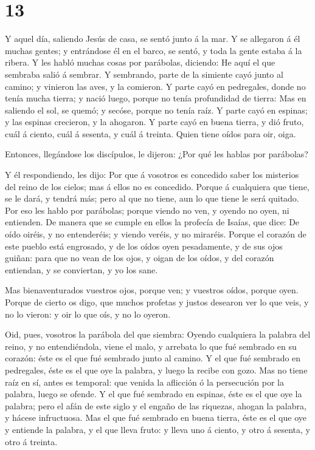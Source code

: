 \hypertarget{section-12}{%
\section{13}\label{section-12}}

 Y aquel día, saliendo Jesús de casa, se sentó junto á la
mar.  Y se allegaron á él muchas gentes; y entrándose él en
el barco, se sentó, y toda la gente estaba á la ribera.  Y
les habló muchas cosas por parábolas, diciendo: He aquí el que sembraba
salió á sembrar.  Y sembrando, parte de la simiente cayó
junto al camino; y vinieron las aves, y la comieron.  Y
parte cayó en pedregales, donde no tenía mucha tierra; y nació luego,
porque no tenía profundidad de tierra:  Mas en saliendo el
sol, se quemó; y secóse, porque no tenía raíz.  Y parte cayó
en espinas; y las espinas crecieron, y la ahogaron.  Y parte
cayó en buena tierra, y dió fruto, cuál á ciento, cuál á sesenta, y cuál
á treinta.  Quien tiene oídos para oir, oiga.

 Entonces, llegándose los discípulos, le dijeron: ¿Por qué
les hablas por parábolas?

 Y él respondiendo, les dijo: Por que á vosotros es
concedido saber los misterios del reino de los cielos; mas á ellos no es
concedido.  Porque á cualquiera que tiene, se le dará, y
tendrá más; pero al que no tiene, aun lo que tiene le será quitado.
 Por eso les hablo por parábolas; porque viendo no ven, y
oyendo no oyen, ni entienden.  De manera que se cumple en
ellos la profecía de Isaías, que dice: De oído oiréis, y no entenderéis;
y viendo veréis, y no miraréis.  Porque el corazón de este
pueblo está engrosado, y de los oídos oyen pesadamente, y de sus ojos
guiñan: para que no vean de los ojos, y oigan de los oídos, y del
corazón entiendan, y se conviertan, y yo los sane.

 Mas bienaventurados vuestros ojos, porque ven; y vuestros
oídos, porque oyen.  Porque de cierto os digo, que muchos
profetas y justos desearon ver lo que veis, y no lo vieron: y oir lo que
oís, y no lo oyeron.

 Oid, pues, vosotros la parábola del que siembra:
 Oyendo cualquiera la palabra del reino, y no
entendiéndola, viene el malo, y arrebata lo que fué sembrado en su
corazón: éste es el que fué sembrado junto al camino.  Y el
que fué sembrado en pedregales, éste es el que oye la palabra, y luego
la recibe con gozo.  Mas no tiene raíz en sí, antes es
temporal: que venida la aflicción ó la persecución por la palabra, luego
se ofende.  Y el que fué sembrado en espinas, éste es el
que oye la palabra; pero el afán de este siglo y el engaño de las
riquezas, ahogan la palabra, y hácese infructuosa.  Mas el
que fué sembrado en buena tierra, éste es el que oye y entiende la
palabra, y el que lleva fruto: y lleva uno á ciento, y otro á sesenta, y
otro á treinta.

